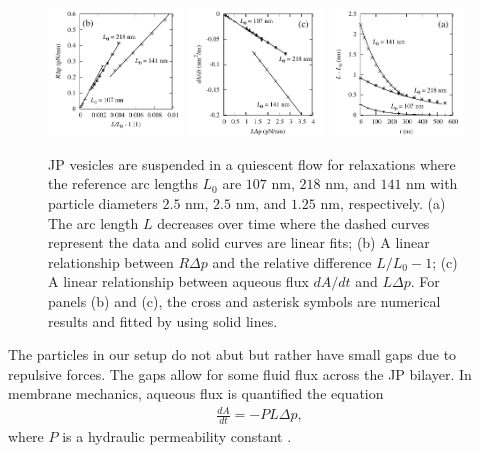 \documentclass[lineno]{jfm}
\begin{document}
\begin{figure}
\centering
\includegraphics[width=0.32\textwidth]{PermPanelB.pdf}
\includegraphics[width=0.32\textwidth]{PermPanelC.pdf}
\includegraphics[width=0.32\textwidth]{PermPanelA.pdf}
  \caption{\label{figure:permeability} JP vesicles are suspended in a
  quiescent flow for relaxations where the reference arc lengths $L_0$
  are $107$ nm, $218$ nm, and $141$ nm with particle diameters $2.5$ nm,
  $2.5$ nm, and $1.25$ nm, respectively. (a) The arc length $L$
  decreases over time where the dashed curves represent the data and
  solid curves are linear fits; (b) A linear relationship between
  $R\Delta p$ and the relative difference $L/L_0-1$; (c) A linear
  relationship between aqueous flux $dA/dt$ and $L\Delta p$. For panels
  (b) and (c), the cross and asterisk symbols are numerical results and
  fitted by using solid lines.}
\end{figure}

The particles in our setup do not abut but rather have small gaps due to
repulsive forces.  The gaps allow for some fluid flux across the JP
bilayer.  In membrane mechanics, aqueous flux is quantified the equation
\begin{align}
  \label{eq:perm} 
  \frac{dA}{dt} = -P  L \Delta p,
\end{align}
where $P$ is a hydraulic permeability constant \cite{CHABANON,
qua-gan-you2021}.
\end{document}
